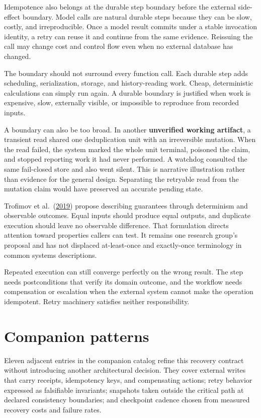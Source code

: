 Idempotence also belongs at the durable step boundary before the external side-effect boundary. Model calls are natural durable steps because they can be slow, costly, and irreproducible. Once a model result commits under a stable invocation identity, a retry can reuse it and continue from the same evidence. Reissuing the call may change cost and control flow even when no external database has changed.

The boundary should not surround every function call. Each durable step adds scheduling, serialization, storage, and history-reading work. Cheap, deterministic calculations can simply run again. A durable boundary is justified when work is expensive, slow, externally visible, or impossible to reproduce from recorded inputs.

A boundary can also be too broad. In another \textbf{unverified working artifact}, a transient read shared one deduplication unit with an irreversible mutation. When the read failed, the system marked the whole unit terminal, poisoned the claim, and stopped reporting work it had never performed. A watchdog consulted the same fail-closed store and also went silent. This is narrative illustration rather than evidence for the general design. Separating the retryable read from the mutation claim would have preserved an accurate pending state.

Trofimov et al.~(\href{https://arxiv.org/abs/1907.06250}{2019}) propose describing guarantees through determinism and observable outcomes. Equal inputs should produce equal outputs, and duplicate execution should leave no observable difference. That formulation directs attention toward properties callers can test. It remains one research group's proposal and has not displaced at-least-once and exactly-once terminology in common systems descriptions.

Repeated execution can still converge perfectly on the wrong result. The step needs postconditions that verify its domain outcome, and the workflow needs compensation or escalation when the external system cannot make the operation idempotent. Retry machinery satisfies neither responsibility.

\section{Companion patterns}\label{companion-patterns}

Eleven adjacent entries in the companion catalog refine this recovery contract without introducing another architectural decision. They cover external writes that carry receipts, idempotency keys, and compensating actions; retry behavior expressed as falsifiable invariants; snapshots taken outside the critical path at declared consistency boundaries; and checkpoint cadence chosen from measured recovery costs and failure rates.

